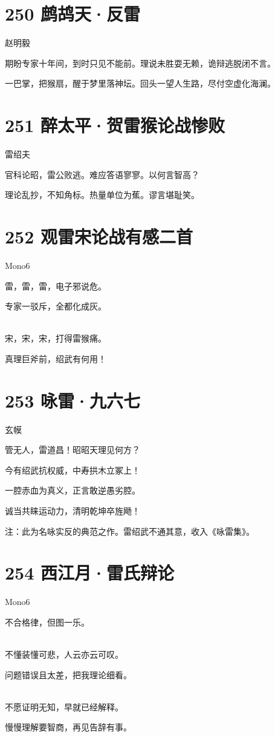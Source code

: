 \documentclass[UTF8,12pt,oneside]{ctexbook}
\def\pau#1{\begin{center} {#1} \end{center}} %
\def\poem#1#2{\section{#1}\pau{#2}} %
\begin{document}
        \newpage

        \poem{250 鹧鸪天·反雷}{赵明毅}

        期盼专家十年间，到时只见不能前。理说未胜耍无赖，诡辩逃脱闭不言。
        
        一巴掌，把猴扇，醒于梦里落神坛。回头一望人生路，尽付空虚化海澜。

        \poem{251 醉太平·贺雷猴论战惨败}{雷绍夫}

        官科论昭，雷公败逃。难应答语寥寥。以何言智高？

        理论乱抄，不知角标。热量单位为蕉。谬言堪耻笑。

        \poem{252 观雷宋论战有感二首}{Mono6}
        \begin{center}
        雷，雷，雷，电子邪说危。
        
        专家一驳斥，全都化成灰。
        
        ~\\
        宋，宋，宋，打得雷猴痛。
        
        真理巨斧前，绍武有何用！
        \end{center}

        \poem{253 咏雷·九六七}{玄幙}
        \begin{center}
        管无人，雷道昌！昭昭天理见何方？
        
        今有绍武抗权威，中寿拱木立冢上！
        
        一腔赤血为真义，正言敢逆愚劣腔。
        
        诚当共睐运动力，清明乾坤卒旌飏！
        \end{center}
        \kaishu

        注：此为名咏实反的典范之作。雷绍武不通其意，收入《咏雷集》。
        ~\\
        \songti

        \poem{254 西江月·雷氏辩论}{Mono6}
        \begin{center}
        \kaishu
        不合格律，但图一乐。
        
        \songti
        ~\\
        不懂装懂可悲，人云亦云可叹。
        
        问题错误且太差，把我理论细看。
        
        ~\\
        不愿证明无知，早就已经解释。
        
        慢慢理解要智商，再见告辞有事。
        \end{center}
\end{document}
